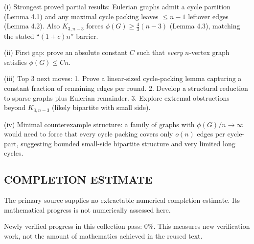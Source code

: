 (i) Strongest proved partial results: Eulerian graphs admit a cycle partition (Lemma 4.1) and any maximal cycle packing leaves $\le n-1$ leftover edges (Lemma 4.2).
Also $K_{3,n-3}$ forces $\phi(G)\ge \frac43(n-3)$ (Lemma 4.3), matching the stated ``$(1+c)n$'' barrier.

(ii) First gap: prove an absolute constant $C$ such that \emph{every} $n$-vertex graph satisfies $\phi(G)\le Cn$.

(iii) Top 3 next moves:
1. Prove a linear-sized cycle-packing lemma capturing a constant fraction of remaining edges per round.
2. Develop a structural reduction to sparse graphs plus Eulerian remainder.
3. Explore extremal obstructions beyond $K_{3,n-3}$ (likely bipartite with small side).

(iv) Minimal counterexample structure: a family of graphs with $\phi(G)/n\to\infty$ would need to force that every cycle packing covers
only $o(n)$ edges per cycle-part, suggesting bounded small-side bipartite structure and very limited long cycles.



\subsection*{COMPLETION ESTIMATE}
The primary source supplies no extractable numerical completion estimate. Its mathematical progress is not numerically assessed here.

Newly verified progress in this collection pass: $0\%$. This measures new verification work, not the amount of mathematics achieved in the reused text.
